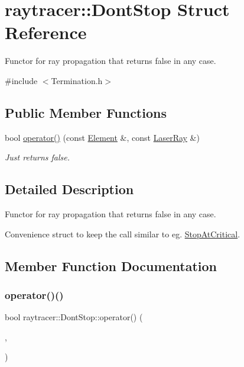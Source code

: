 \hypertarget{structraytracer_1_1DontStop}{}\section{raytracer\+:\+:Dont\+Stop Struct Reference}
\label{structraytracer_1_1DontStop}


Functor for ray propagation that returns false in any case.  




{\ttfamily \#include $<$Termination.\+h$>$}

\subsection*{Public Member Functions}
\begin{DoxyCompactItemize}
\item 
bool \hyperlink{structraytracer_1_1DontStop_a1b7c7429e15c8aced0dd2a0d296c2e17}{operator()} (const \hyperlink{classraytracer_1_1Element}{Element} \&, const \hyperlink{classraytracer_1_1LaserRay}{Laser\+Ray} \&)
\begin{DoxyCompactList}\small\item\em Just returns false. \end{DoxyCompactList}\end{DoxyCompactItemize}


\subsection{Detailed Description}
Functor for ray propagation that returns false in any case. 

Convenience struct to keep the call similar to eg. \hyperlink{structraytracer_1_1StopAtCritical}{Stop\+At\+Critical}. 

\subsection{Member Function Documentation}
\mbox{\label{structraytracer_1_1DontStop_a1b7c7429e15c8aced0dd2a0d296c2e17}} 
\subsubsection{\texorpdfstring{operator()()}{operator()()}}
{\footnotesize\ttfamily bool raytracer\+::\+Dont\+Stop\+::operator() (\begin{DoxyParamCaption}\item[{const \hyperlink{classraytracer_1_1Element}{Element} \&}]{,  }\item[{const \hyperlink{classraytracer_1_1LaserRay}{Laser\+Ray} \&}]{ }\end{DoxyParamCaption})}



